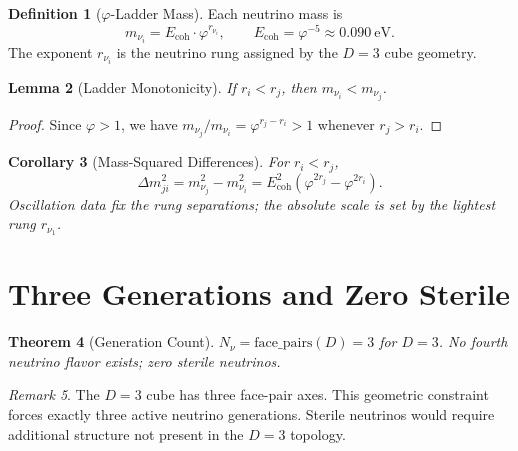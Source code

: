 \documentclass[12pt,a4paper]{article}
\newtheorem{theorem}{Theorem}[section]
\newtheorem{lemma}[theorem]{Lemma}
\newtheorem{corollary}[theorem]{Corollary}
\theoremstyle{definition}
\newtheorem{definition}[theorem]{Definition}
\theoremstyle{remark}
\newtheorem{remark}[theorem]{Remark}
\begin{document}
\begin{definition}[$\varphi$-Ladder Mass]
\label{def:mass}
Each neutrino mass is
\begin{equation}
  m_{\nu_i} = E_{\mathrm{coh}} \cdot \varphi^{r_{\nu_i}},
  \qquad E_{\mathrm{coh}} = \varphi^{-5} \approx 0.090~\mathrm{eV}.
\end{equation}
The exponent $r_{\nu_i}$ is the neutrino rung assigned by the
$D = 3$ cube geometry.
\end{definition}

\begin{lemma}[Ladder Monotonicity]
\label{lem:mono}
If $r_i < r_j$, then $m_{\nu_i} < m_{\nu_j}$.
\end{lemma}

\begin{proof}
Since $\varphi > 1$, we have $m_{\nu_j}/m_{\nu_i} =
\varphi^{r_j - r_i} > 1$ whenever $r_j > r_i$.
\end{proof}

\begin{corollary}[Mass-Squared Differences]
\label{cor:deltam}
For $r_i < r_j$,
\begin{equation}
  \Delta m^2_{ji} = m_{\nu_j}^2 - m_{\nu_i}^2
  = E_{\mathrm{coh}}^2 \left( \varphi^{2r_j} - \varphi^{2r_i} \right).
\end{equation}
Oscillation data fix the rung separations; the absolute scale is set
by the lightest rung $r_{\nu_1}$.
\end{corollary}

\section{Three Generations and Zero Sterile}
\label{sec:generations}

\begin{theorem}[Generation Count]
\label{thm:count}
$N_\nu = \mathrm{face\_pairs}(D) = 3$ for $D = 3$.  No fourth
neutrino flavor exists; zero sterile neutrinos.
\end{theorem}

\begin{remark}
The $D = 3$ cube has three face-pair axes.  This geometric constraint
forces exactly three active neutrino generations.  Sterile neutrinos
would require additional structure not present in the $D = 3$
topology.
\end{remark}
\end{document}
